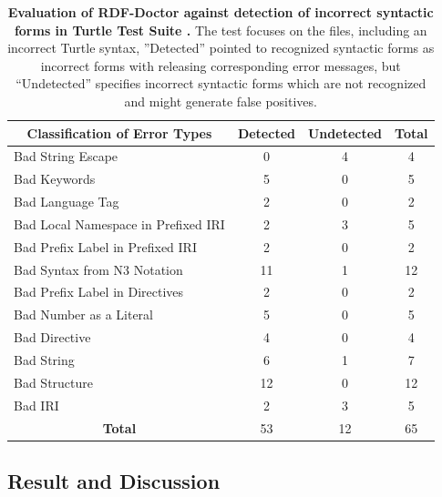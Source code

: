  
\begin{table}[]
\centering
\begin{tabular}{|l|c|c|c|}
\hline
\multicolumn{1}{|c|}{\textbf{Classification of Error Types}} &{\textbf{Detected}} & {\textbf{Undetected}} & {\textbf{Total}} \\ \hline
 Bad String Escape              &      0    &    4 &   4  \\ \hline
 Bad Keywords             &      5   &    0 &   5  \\ \hline
 Bad Language Tag             &      2   &    0 &   2  \\ \hline
 Bad Local Namespace in Prefixed IRI             &      2   &    3  &   5  \\ \hline
 Bad Prefix Label in Prefixed IRI             &      2   &    0 &   2  \\ \hline
 Bad Syntax from N3 Notation             &      11   &    1 &   12  \\ \hline
 Bad Prefix Label in Directives            &      2   &    0 &   2  \\ \hline
 Bad Number as a Literal             &      5   &    0 &   5  \\ \hline
 Bad Directive             &      4   &    0 &   4  \\ \hline
 Bad String             &      6   &    1 &   7  \\ \hline
 Bad Structure            &      12   &    0 &   12  \\ \hline
 Bad IRI            &      2   &    3 &   5  \\ \hline
 \multicolumn{1}{|c|}{\textbf{Total}}            &      53   &    12 &   65  \\ \hline
\end{tabular}
\caption{\textbf{Evaluation of RDF-Doctor against detection of incorrect syntactic forms in Turtle Test Suite \cite{TurtleTests:Online}.} The test focuses on the files, including  an incorrect Turtle syntax,  ”Detected” pointed to recognized syntactic forms as incorrect forms with releasing corresponding error messages, but ``Undetected” specifies incorrect syntactic forms which are not recognized and might generate false positives.}
\label{tab:detection}
\end{table}

\subsection{Result and Discussion}

